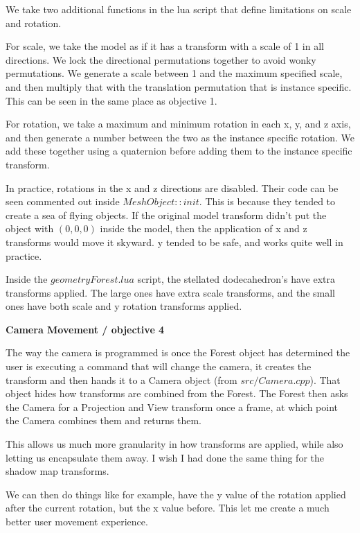 \documentclass[10pt]{article}
\begin{document}
	We take two additional functions in the lua script that define limitations on scale and rotation. 
	
	For scale, we take the model as if it has a transform with a scale of 1 in all directions. We lock the directional permutations together to avoid wonky permutations. We generate a scale between 1 and the maximum specified scale, and then multiply that with the translation permutation that is instance specific. This can be seen in the same place as objective 1.
	
	For rotation, we take a maximum and minimum rotation in each x, y, and z axis, and then generate a number between the two as the instance specific rotation. We add these together using a quaternion before adding them to the instance specific transform.
	
	In practice, rotations in the x and z directions are disabled. Their code can be seen commented out inside $MeshObject::init$. This is because they tended to create a sea of flying objects. If the original model transform didn't put the object with $(0, 0, 0)$ inside the model, then the application of x and z transforms would move it skyward. y tended to be safe, and works quite well in practice.
	
	Inside the $geometryForest.lua$ script, the stellated dodecahedron's have extra transforms applied. The large ones have extra scale transforms, and the small ones have both scale and y rotation transforms applied.
	
	\begin{center}
		\bf Camera Movement / objective 4
	\end{center}
	
	The way the camera is programmed is once the Forest object has determined the user is executing a command that will change the camera, it creates the transform and then hands it to a Camera object (from $src/Camera.cpp$). That object hides how transforms are combined from the Forest. The Forest then asks the Camera for a Projection and View transform once a frame, at which point the Camera combines them and returns them.
	
	This allows us much more granularity in how transforms are applied, while also letting us encapsulate them away. I wish I had done the same thing for the shadow map transforms.
	
	We can then do things like for example, have the y value of the rotation applied after the current rotation, but the x value before. This let me create a much better user movement experience.
	
\end{document}
